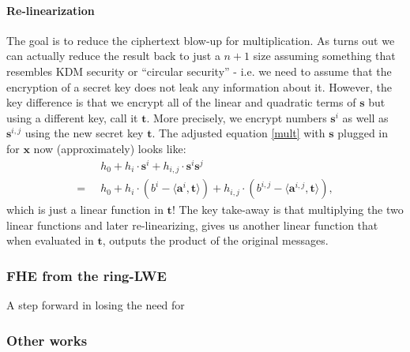 \paragraph{Re-linearization}
The goal is to reduce the ciphertext blow-up for multiplication. As turns out we can actually reduce the result back to just a $n+1$ size assuming something that resembles KDM security or ``circular security'' - i.e. we need to assume that the encryption of a secret key does not leak any information about it. However, the key difference is that we encrypt all of the linear and quadratic terms of $\bm{s}$ but using a different key, call it $\bm{t}$. More precisely, we encrypt numbers $\bm{s}^i$ as well as $\bm{s}^{i,j}$ using the new secret key $\bm{t}$. The adjusted equation \ref{mult} with $\bm{s}$ plugged in for $\bm{x}$ now (approximately) looks like: 
\begin{align*}
  & h_0 + h_i \cdot \bm{s}^i + h_{i,j} \cdot \bm{s}^i \bm{s}^j\\
  = \; \; & h_0 + h_i \cdot (b^i - \langle \bm{a}^i, \bm{t} \rangle) + h_{i,j} \cdot (b^{i,j} - \langle \bm{a}^{i,j}, \bm{t} \rangle), 
\end{align*}
which is just a linear function in $\bm{t}$! The key take-away is that multiplying the two linear functions and later re-linearizing, gives us another linear function that when evaluated in $\bm{t}$, outputs the product of the original messages.

\subsubsection{FHE from the ring-LWE}
A step forward in losing the need for
\subsubsection{Other works}

